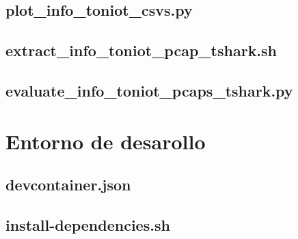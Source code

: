 \documentclass[11pt]{report}
\begin{document}
\section{plot\_info\_toniot\_csvs.py}


\section{extract\_info\_toniot\_pcap\_tshark.sh}


\section{evaluate\_info\_toniot\_pcaps\_tshark.py}


\chapter{Entorno de desarollo}
\section{devcontainer.json}


\section{install-dependencies.sh}

\end{document}
